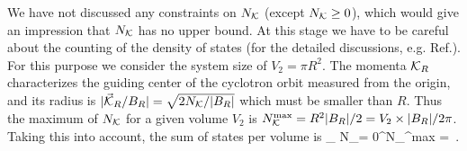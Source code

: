 We have not discussed any constraints on $N_{\mathcal{K}}$ (except $N_{\mathcal{K}} \ge 0$), which would give an impression that $N_{\mathcal{K}}$ has no upper bound. At this stage we have to be careful about the counting of the density of states (for the detailed discussions, e.g. Ref.\cite{Hattori:2015aki}). For this purpose we consider the system size of $V_2 = \pi R^2$. The momenta $\mathcal{K}_R$ characterizes the guiding center of the cyclotron orbit measured from the origin, and its radius is $|\vec{\mathcal{K}}_R/B_R | = \sqrt{2 N_{\mathcal{K}}/|B_R|}$ which must be smaller than $R$. 
Thus the maximum of $N_{\mathcal{K}}$ for a given volume $V_2$ is $N_{\mathcal{K}}^{\rm max} = R^2 |B_R|/2 = V_2 \times | B_R |/2\pi$. Taking this into account, the sum of states per volume  is
%
\beq
{} \sum_{ N_\calK = 0}^{N_\calK^{\rm max} }  %
=  \,. %
\eeq
%



